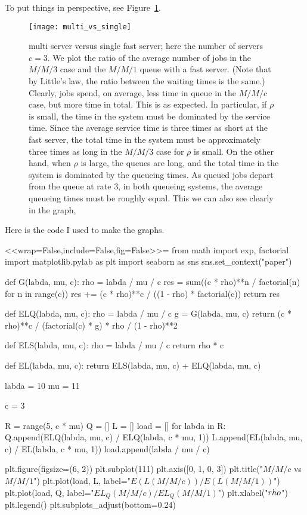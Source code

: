 \begin{question}
\begin{solution}
\begin{enumerate}
To put things in perspective, see Figure~\ref{fig:multisingle}. 
\begin{figure}[h]
  \centering
\texttt{[image: multi\_vs\_single]}
  \caption{multi server versus single fast server; here the number of
    servers $c=3$. We plot the ratio of the average number of jobs in
    the $M/M/3$ case and the $M/M/1$ queue with a fast server. (Note
    that by Little's law, the ratio between the waiting times is the
    same.) Clearly, jobs spend, on average, less time in queue in the
    $M/M/c$ case, but more time in total. This is as expected. In
    particular, if $\rho$ is small, the time in the system must be
    dominated by the service time. Since the average service time is
    three times as short at the fast server, the total time in the
    system must be approximately three times as long in the $M/M/3$
    case for $\rho$ is small. On the other hand, when $\rho$ is large,
    the queues are long, and the total time in the system is dominated
    by the queueing times.  As queued jobs depart from the queue at
    rate $3$, in both queueing systems, the average queueing times
    must be roughly equal. This we can also see clearly in the graph,}
  \label{fig:multisingle}
\end{figure}

Here is the code I used to make the graphs.

<<wrap=False,include=False,fig=False>>=
from math import exp, factorial
import matplotlib.pylab as plt
import seaborn as sns
sns.set_context("paper")


def G(labda, mu, c):
    rho = labda / mu / c
    res = sum((c * rho)**n / factorial(n) for n in range(c))
    res += (c * rho)**c / ((1 - rho) * factorial(c))
    return res


def ELQ(labda, mu, c):
    rho = labda / mu / c
    g = G(labda, mu, c)
    return (c * rho)**c / (factorial(c) * g) * rho / (1 - rho)**2


def ELS(labda, mu, c):
    rho = labda / mu / c
    return rho * c


def EL(labda, mu, c):
    return ELS(labda, mu, c) + ELQ(labda, mu, c)


labda = 10
mu = 11

c = 3

R = range(5, c * mu)
Q = []
L = []
load = []
for labda in R:
    Q.append(ELQ(labda, mu, c) / ELQ(labda, c * mu, 1))
    L.append(EL(labda, mu, c) / EL(labda, c * mu, 1))
    load.append(labda / mu / c)

plt.figure(figsize=(6, 2))
plt.subplot(111)
plt.axis([0, 1, 0, 3])
plt.title("$M/M/c$ vs $M/M/1$")
plt.plot(load, L, label="$E(L(M/M/c))/E(L(M/M/1))$")
plt.plot(load, Q, label="$EL_Q(M/M/c)/EL_Q(M/M/1)$")
plt.xlabel("$\\rho$")
plt.legend()
plt.subplots_adjust(bottom=0.24)


\end{enumerate}
\end{solution}
\end{question}

